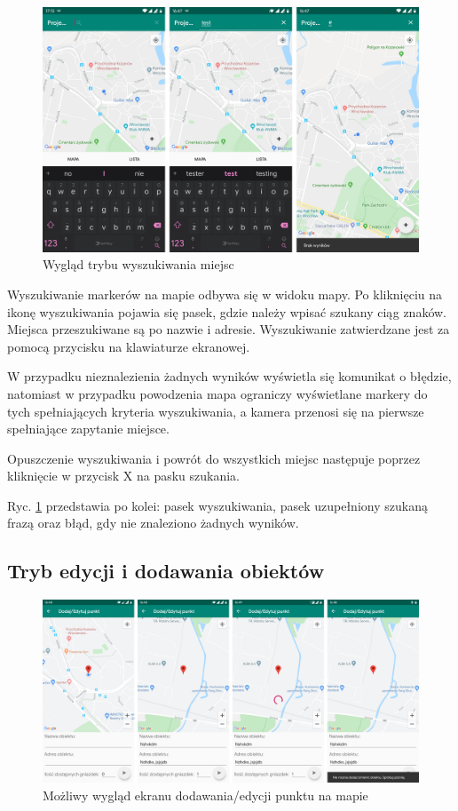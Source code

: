 \documentclass[polish,polish,a4paper,12pt]{article}
\begin{document}
	\begin{figure}[H]
		\centering
		\includegraphics[width = \textwidth]{screenshot-search}
		\caption{Wygląd trybu wyszukiwania miejsc}
		\label{fig:screenshotsearch}
	\end{figure}

	Wyszukiwanie markerów na mapie odbywa się w widoku mapy. Po kliknięciu na ikonę wyszukiwania pojawia się pasek, gdzie należy wpisać szukany ciąg znaków. Miejsca przeszukiwane są po nazwie i adresie. Wyszukiwanie zatwierdzane jest za pomocą przycisku na klawiaturze ekranowej.

	W przypadku nieznalezienia żadnych wyników wyświetla się komunikat o błędzie, natomiast w przypadku powodzenia mapa ograniczy wyświetlane markery do tych spełniających kryteria wyszukiwania, a kamera przenosi się na pierwsze spełniające zapytanie miejsce.

	Opuszczenie wyszukiwania i powrót do wszystkich miejsc następuje poprzez kliknięcie w przycisk X na pasku szukania.

	Ryc. \ref{fig:screenshotsearch} przedstawia po kolei: pasek wyszukiwania, pasek uzupełniony szukaną frazą oraz błąd, gdy nie znaleziono żadnych wyników.

	\subsection{Tryb edycji i dodawania obiektów}

	\begin{figure}[H]
		\centering
		\includegraphics[width = \textwidth]{screenshot-addedit}
		\caption{Możliwy wygląd ekranu dodawania/edycji punktu na mapie}
		\label{fig:screenshotaddedit}
	\end{figure}
\end{document}
